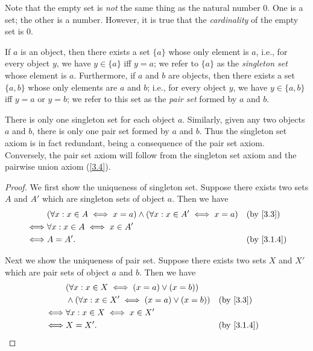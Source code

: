 \begin{rmk}\label{3.1.8}
  Note that the empty set is \emph{not} the same thing as the natural number \(0\).
  One is a set;
  the other is a number.
  However, it is true that the \emph{cardinality} of the empty set is \(0\).
\end{rmk}

\begin{ax}\label{3.3}
  If \(a\) is an object, then there exists a set \(\{a\}\) whose only element is \(a\), i.e., for every object \(y\), we have \(y \in \{a\}\) iff \(y = a\);
  we refer to \(\{a\}\) as the \emph{singleton set} whose element is \(a\).
  Furthermore, if \(a\) and \(b\) are objects, then there exists a set \(\{a, b\}\) whose only elements are \(a\) and \(b\);
  i.e., for every object \(y\), we have \(y \in \{a, b\}\) iff \(y = a\) or \(y = b\);
  we refer to this set as the \emph{pair set} formed by \(a\) and \(b\).
\end{ax}

\begin{rmk}\label{3.1.9}
  There is only one singleton set for each object \(a\).
  Similarly, given any two objects \(a\) and \(b\), there is only one pair set formed by \(a\) and \(b\).
  Thus the singleton set axiom is in fact redundant, being a consequence of the pair set axiom.
  Conversely, the pair set axiom will follow from the singleton set axiom and the pairwise union axiom (\cref{3.4}).
\end{rmk}

\begin{proof}
  We first show the uniqueness of singleton set.
  Suppose there exists two sets \(A\) and \(A'\) which are singleton sets of object \(a\).
  Then we have
  \begin{align*}
         & (\forall x : x \in A \iff x = a) \land (\forall x : x \in A' \iff x = a) &  & \text{(by \cref{3.3})} \\
    \iff & \forall x : x \in A \iff x \in A'                                                                    \\
    \iff & A = A'.                                                                  &  & \by{3.1.4}
  \end{align*}

  Next we show the uniqueness of pair set.
  Suppose there exists two sets \(X\) and \(X'\) which are pair sets of object \(a\) and \(b\).
  Then we have
  \begin{align*}
         & (\forall x : x \in X \iff (x = a) \lor (x = b))                                    \\
         & \land (\forall x : x \in X' \iff (x = a) \lor (x = b)) &  & \text{(by \cref{3.3})} \\
    \iff & \forall x : x \in X \iff x \in X'                                                  \\
    \iff & X = X'.                                                &  & \by{3.1.4}
  \end{align*}
\end{proof}

